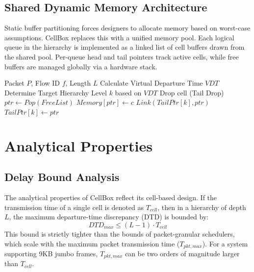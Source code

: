 \documentclass[conference]{IEEEtran}
\begin{document}
\subsection{Shared Dynamic Memory Architecture}
Static buffer partitioning forces designers to allocate memory based on worst-case assumptions. CellBox replaces this with a unified memory pool.
Each logical queue in the hierarchy is implemented as a linked list of cell buffers drawn from the shared pool. Per-queue head and tail pointers track active cells, while free buffers are managed globally via a hardware stack.

\begin{algorithm}
\caption{Dynamic Memory Enqueue Logic}
\begin{algorithmic}
\REQUIRE Packet $P$, Flow ID $f$, Length $L$
\STATE Calculate Virtual Departure Time $VDT$
\STATE Determine Target Hierarchy Level $k$ based on $VDT$
        \STATE Drop cell (Tail Drop)
    \ELSE
        \STATE $ptr \leftarrow Pop(FreeList)$
        \STATE $Memory[ptr] \leftarrow c$
        \STATE $Link(TailPtr[k], ptr)$
        \STATE $TailPtr[k] \leftarrow ptr$
    \ENDIF
\ENDFOR
\end{algorithmic}
\end{algorithm}

\section{Analytical Properties}
\label{sec:analysis}

\subsection{Delay Bound Analysis}
The analytical properties of CellBox reflect its cell-based design. If the transmission time of a single cell is denoted as $T_{cell}$, then in a hierarchy of depth $L$, the maximum departure-time discrepancy (DTD) is bounded by:
\begin{equation}
    DTD_{max} \le (L - 1) \cdot T_{cell}
\end{equation}
This bound is strictly tighter than the bounds of packet-granular schedulers, which scale with the maximum packet transmission time ($T_{pkt,max}$). For a system supporting 9KB jumbo frames, $T_{pkt,max}$ can be two orders of magnitude larger than $T_{cell}$.
\end{document}
